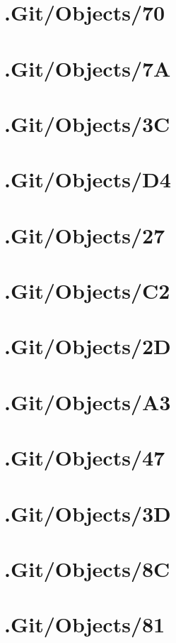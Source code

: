 \section*{.Git/Objects/70}

\section*{.Git/Objects/7A}

\section*{.Git/Objects/3C}

\section*{.Git/Objects/D4}

\section*{.Git/Objects/27}

\section*{.Git/Objects/C2}

\section*{.Git/Objects/2D}

\section*{.Git/Objects/A3}

\section*{.Git/Objects/47}

\section*{.Git/Objects/3D}

\section*{.Git/Objects/8C}

\section*{.Git/Objects/81}

